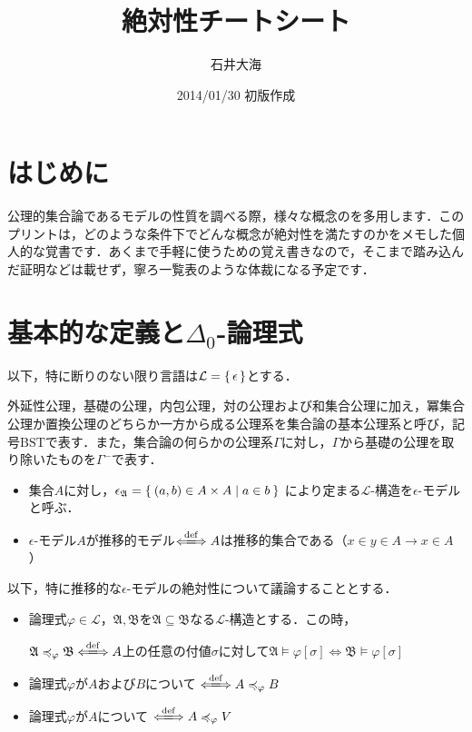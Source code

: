 \documentclass[xelatex,a4j,jadriver=standard]{bxjsarticle}
\title{絶対性チートシート}
\author{石井大海}
\date{2014/01/30 初版作成}
\renewcommand{\emph}[1]{\textsf{\textgt{#1}}}
\newcommand{\BST}{\mathrm{BST}}
\begin{document}
\maketitle

\section{はじめに}
公理的集合論であるモデルの性質を調べる際，様々な概念の\emph{絶対性}を多用します．このプリントは，どのような条件下でどんな概念が絶対性を満たすのかをメモした個人的な覚書です．あくまで手軽に使うための覚え書きなので，そこまで踏み込んだ証明などは載せず，寧ろ一覧表のような体裁になる予定です．

\section{基本的な定義と$\Delta_0$-論理式}
以下，特に断りのない限り言語は$\mathcal{L} = \set{\epsilon}$とする．

\begin{definition}
 外延性公理，基礎の公理，内包公理，対の公理および和集合公理に加え，冪集合公理か置換公理のどちらか一方から成る公理系を集合論の基本公理系と呼び，記号$\BST$で表す．また，集合論の何らかの公理系$\Gamma$に対し，$\Gamma$から基礎の公理を取り除いたものを$\Gamma^-$で表す．
\end{definition}

\begin{definition}
\begin{itemize}
 \item 集合$A$に対し，$\epsilon_\mathfrak{A} = \Set{ (a, b) \in A \times A | a \in b}$ により定まる$\mathcal{L}$-構造を$\epsilon$-モデルと呼ぶ．
 \item $\epsilon$-モデル$A$が推移的モデル$\defs A$は推移的集合である（$x \in y \in A \rightarrow x \in A$）
\end{itemize}
\end{definition}

以下，特に推移的な$\epsilon$-モデルの絶対性について議論することとする．

\begin{definition}[絶対性]
 \begin{itemize}
  \item 論理式$\varphi \in \mathcal{L}$，$\mathfrak{A}, \mathfrak{B}$を$\mathfrak{A} \subseteq \mathfrak{B}$なる$\mathcal{L}$-構造とする．この時，
	
	$\mathfrak{A} \preccurlyeq_\varphi \mathfrak{B} \defs A$上の任意の付値$\sigma$に対して$\mathfrak{A} \models \varphi[\sigma] \Leftrightarrow \mathfrak{B} \models \varphi[\sigma]$
  \item 論理式$\varphi$が$A$および$B$について\emph{絶対的} $\defs A \preccurlyeq_\varphi B$
  \item 論理式$\varphi$が$A$について\emph{絶対的} $\defs A \preccurlyeq_\varphi V$
 \end{itemize}
\end{definition}
\end{document}
